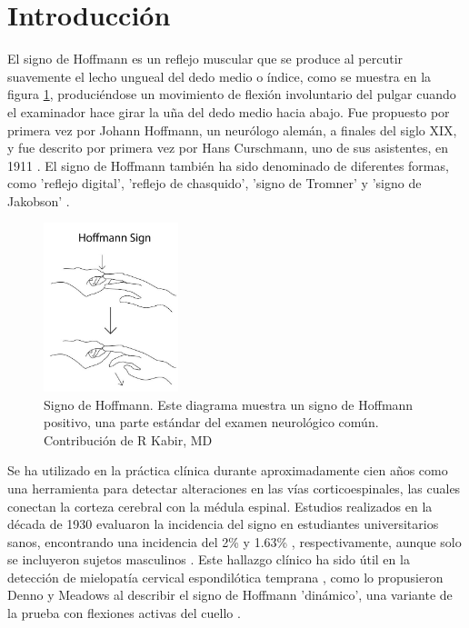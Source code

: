 \section{Introducción}
El signo de Hoffmann es un reflejo muscular que se produce al percutir suavemente el lecho ungueal del dedo medio o índice, como se muestra en la figura \ref{fig:Hoffmann_sign}, produciéndose un movimiento de flexión involuntario del pulgar cuando el examinador hace girar la uña del dedo medio hacia abajo. Fue propuesto por primera vez por Johann Hoffmann, un neurólogo alemán, a finales del siglo XIX, y fue descrito por primera vez por Hans Curschmann, uno de sus asistentes, en 1911 \cite{BENDHEIM}. El signo de Hoffmann también ha sido denominado de diferentes formas, como 'reflejo digital', 'reflejo de chasquido', 'signo de Tromner' y 'signo de Jakobson' \cite{glaser2001cervical}.

\begin{figure}[h!]
	\includegraphics[width=0.35\textwidth]{figures/Kabir_Hoffmann__Sign.jpg}
	\caption{Signo de Hoffmann. Este diagrama muestra un signo de Hoffmann positivo, una parte estándar del examen neurológico común. Contribución de R Kabir, MD}
	\label{fig:Hoffmann_sign}
\end{figure}

Se ha utilizado en la práctica clínica durante aproximadamente cien años como una herramienta para detectar alteraciones en las vías corticoespinales, las cuales conectan la corteza cerebral con la médula espinal. Estudios realizados en la década de 1930 evaluaron la incidencia del signo en estudiantes universitarios sanos, encontrando una incidencia del 2\% y 1.63\% \cite{echols1936hoffmann} \cite{fay1933clinical}, respectivamente, aunque solo se incluyeron sujetos masculinos \cite{glaser2001cervical}. Este hallazgo clínico ha sido útil en la detección de mielopatía cervical espondilótica temprana \cite{denno1991early}, como lo propusieron Denno y Meadows al describir el signo de Hoffmann 'dinámico', una variante de la prueba con flexiones activas del cuello \cite{glaser2001cervical}.


